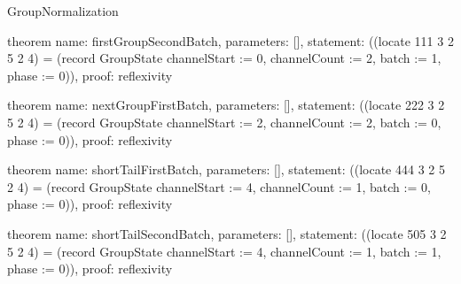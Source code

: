 \begin{lexlean}{GroupNormalization}
\begin{semanticmodule}
theorem{
  name: firstGroupSecondBatch,
  parameters: [],
  statement: ((locate 111 3 2 5 2 4) = (record GroupState {channelStart := 0, channelCount := 2, batch := 1, phase := 0})),
  proof: reflexivity{}
}

theorem{
  name: nextGroupFirstBatch,
  parameters: [],
  statement: ((locate 222 3 2 5 2 4) = (record GroupState {channelStart := 2, channelCount := 2, batch := 0, phase := 0})),
  proof: reflexivity{}
}

theorem{
  name: shortTailFirstBatch,
  parameters: [],
  statement: ((locate 444 3 2 5 2 4) = (record GroupState {channelStart := 4, channelCount := 1, batch := 0, phase := 0})),
  proof: reflexivity{}
}

theorem{
  name: shortTailSecondBatch,
  parameters: [],
  statement: ((locate 505 3 2 5 2 4) = (record GroupState {channelStart := 4, channelCount := 1, batch := 1, phase := 0})),
  proof: reflexivity{}
}
\end{semanticmodule}
\end{lexlean}
